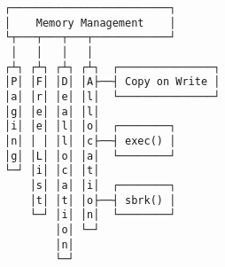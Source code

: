 \documentclass[varwidth,crop]{standalone}
\begin{document}
\begin{verbatim}
┌─────────────────────────┐
│    Memory Management    │
└┬───┬───┬───┬────────────┘
 │   │   │   │  
┌┴┐ ┌┴┐ ┌┴┐ ┌┴┐  ┌───────────────┐
│P│ │F│ │D│ │A├──┤ Copy on Write │
│a│ │r│ │e│ │l│  └───────────────┘ 
│g│ │e│ │a│ │l│
│i│ │e│ │l│ │o│  ┌────────┐
│n│ │ │ │l│ │c├──┤ exec() │
│g│ │L│ │o│ │a│  └────────┘
└─┘ │i│ │c│ │t│ 
    │s│ │a│ │i│  ┌────────┐
    │t│ │t│ │o├──┤ sbrk() │
    └─┘ │i│ │n│  └────────┘       
        │o│ └─┘ 
        │n│     
        └─┘                
\end{verbatim}
\end{document}
